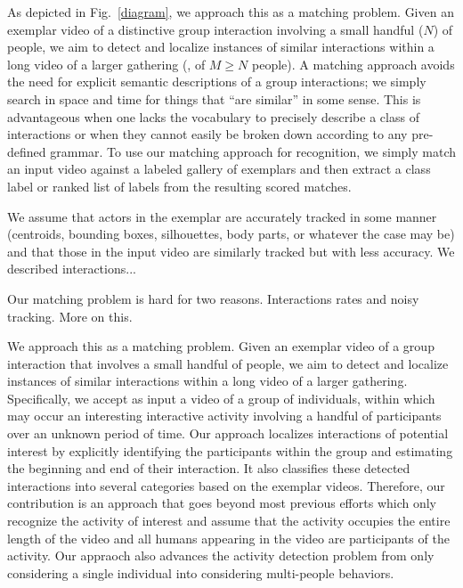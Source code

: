 As depicted in Fig.~\ref{diagram}, we approach this as a matching problem. Given an exemplar video of a distinctive group interaction involving a small handful ($N$) of people, we aim to detect and localize instances of similar interactions within a long video of a larger gathering (\ie, of $M\ge N$ people). A matching approach avoids the need for explicit semantic descriptions of a group interactions; we simply search in space and time for things that ``are similar'' in some sense. This is advantageous when one lacks the vocabulary to precisely describe a class of interactions or when they cannot easily be broken down according to any pre-defined grammar. To use our matching approach for recognition, we simply match an input video against a labeled gallery of exemplars and then extract a class label or ranked list of labels from the resulting scored matches.

We assume that actors in the exemplar are accurately tracked in some manner (centroids, bounding boxes, silhouettes, body parts, or whatever the case may be) and that those in the input video are similarly tracked but with less accuracy. We described interactions...

Our matching problem is hard for two reasons. Interactions rates and noisy tracking. More on this.



We approach this as a matching problem. Given an exemplar video of a group interaction that involves a small handful of people, we aim to detect and localize instances of similar interactions within a long video of a larger gathering. 
Specifically, we accept as input a video of a group of individuals, within which may occur an interesting interactive activity involving a handful of participants over an unknown period of time. Our approach localizes interactions of potential interest by explicitly identifying the participants within the group and estimating the beginning and end of their interaction. It also classifies these detected interactions into several categories based on the exemplar videos. Therefore, our  contribution is an approach that goes beyond most previous efforts \cite{Hongeng:act,Gong:act,Hakeem:act,McCowan:meeting,Ni:group,Choi:recogtrack,Intille:act,Vlad:group} which only recognize the activity of interest and assume that the activity occupies the entire length of the video and all humans appearing in the video are participants of the activity. Our appraoch also advances the activity detection problem from only considering a single individual \cite{Ke:detection,Yuan:detection,Shechtman:detection,Hu:detection,Laptev:detection,Duchenne:detection} into considering multi-people behaviors.

